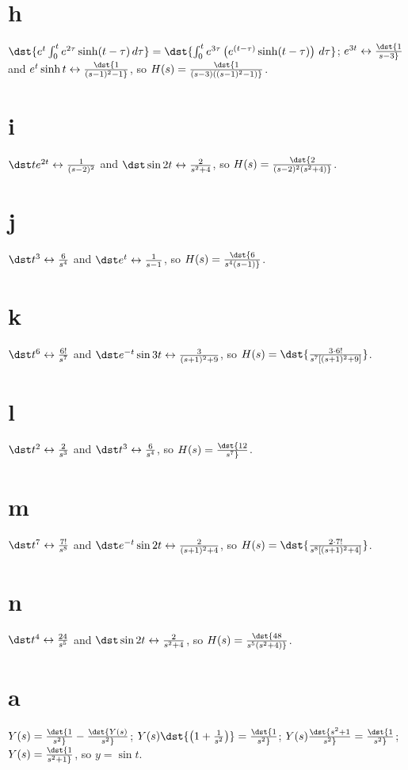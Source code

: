 \documentclass[dvips]{book}
\renewcommand{\exer}[1]{\par\medskip\;\noindent{\color{red}\bf #1.}}
\numberwithin{example}{section}
\numberwithin{equation}{section}
\numberwithin{theorem}{section}
\numberwithin{table}{section}
\numberwithin{figure}{section}
\begin{document}
\part{h} $\dst{e^t\int_0^t e^{2\tau}\sinh (t-\tau)\,d\tau}=
\dst{\int_0^t e^{3\tau}\left(e^{(t-\tau)}\sinh
(t-\tau)\right)\,d\tau}$; $e^{3t}\leftrightarrow\dst{1\over s-3}$ and
$e^t\sinh t\leftrightarrow\dst{1\over(s-1)^2-1}$, so
$H(s)=\dst{1\over (s-3)\left((s-1)^2-1\right)}$.

\part{i} $\dst te^{2t}\leftrightarrow{1\over(s-2)^2}$ and
$\dst\sin2t\leftrightarrow{2\over s^2+4}$, so
 $H(s)=\dst{2\over(s-2)^2(s^2+4)}$.

\part{j}  $\dst t^3\leftrightarrow{6\over s^4}$  and
$\dst e^t\leftrightarrow{1\over s-1}$, so
$H(s)=\dst{6\over s^4(s-1)}$.

\part{k} $\dst t^6\leftrightarrow {6!\over s^7}$ and
$\dst e^{-t}\sin3t\leftrightarrow{3\over(s+1)^2+9}$, so
$H(s)=\dst{{3\cdot 6!\over s^7\left[(s+1)^2+
9\right]}}$.

\part{l}  $\dst t^2\leftrightarrow{2\over s^3}$ and
$\dst t^3\leftrightarrow{6\over s^4}$, so
 $H(s)=\dst{12\over s^7}$.


\part{m} $\dst t^7\leftrightarrow{7!\over s^8}$ and
$\dst e^{-t}\sin2t\leftrightarrow{2\over(s+1)^2+4}$, so
  $H(s)=\dst{{2\cdot 7!\over s^8\left[(s+1)^2+
4\right]}}$.

\part{n} $\dst t^4\leftrightarrow{24\over s^5}$ and
$\dst \sin2t\leftrightarrow{2\over s^2+4}$, so
 $H(s)=\dst{48\over s^5(s^2+4)}$.


\exer{8.6.4}
\part{a}
$Y(s)=\dst{1\over s^2}-\dst{Y(s)\over s^2}$;
$Y(s)\dst{\left(1+{1\over
s^2}\right)}=\dst{1\over s^2}$; $Y(s)\dst{s^2+1\over
s^2}=\dst{1\over s^2}$; $Y(s)=\dst{1\over s^2+1}$, so $y=\sin
t$.
\end{document}

